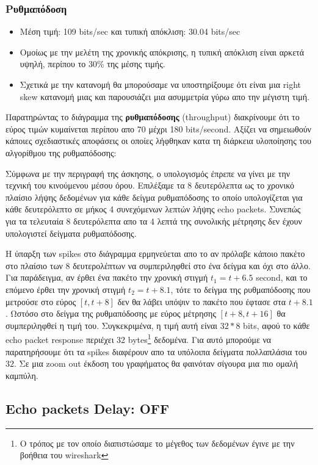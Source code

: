 \documentclass[hidelinks, 12pt, a4paper]{article}
\begin{document}
\subsubsection{Ρυθμαπόδοση}

\begin{itemize}
    \item Μέση τιμή: 109 bits/sec και τυπική απόκλιση: 30.04 bits/sec
    \item Ομοίως με την μελέτη της χρονικής απόκρισης, η τυπική απόκλιση είναι αρκετά υψηλή, περίπου το 30\% της μέσης τιμής.
    \item Σχετικά με την κατανομή θα μπορούσαμε να υποστηρίξουμε ότι είναι μια right skew κατανομή μιας και παρουσιάζει μια ασυμμετρία γύρω απο την μέγιστη τιμή.
\end{itemize}
Παρατηρώντας το διάγραμμα της \textbf{ρυθμαπόδοσης} (throughput) διακρίνουμε ότι το εύρος τιμών κυμαίνεται περίπου απο 70 μέχρι 180 bits/second. Αξίζει να σημειωθούν κάποιες σχεδιαστικές αποφάσεις οι οποίες λήφθηκαν κατα τη διάρκεια υλοποίησης του αλγορίθμου της ρυθμαπόδοσης:

Σύμφωνα με την περιγραφή της άσκησης, ο υπολογισμός έπρεπε να γίνει με την τεχνική του κινούμενου μέσου όρου. Επιλέξαμε τα 8 δευτερόλεπτα ως το χρονικό πλαίσιο λήψης δεδομένων για κάθε δείγμα ρυθμαπόδοσης το οποίο υπολογίζεται για κάθε δευτερόλεπτο σε μήκος 4 συνεχόμενων λεπτών λήψης echo packets. Συνεπώς για τα τελευταία 8 δευτερόλεπτα απο τα 4 λεπτά της συνολικής μέτρησης δεν έχουν υπολογιστεί δείγματα ρυθμαπόδοσης. 

Η ύπαρξη των spikes στο διάγραμμα ερμηνεύεται απο το αν πρόλαβε κάποιο πακέτο στο πλαίσιο των 8 δευτερολέπτων να συμπεριληφθεί στο ένα δείγμα και όχι στο άλλο. Για παράδειγμα, αν έρθει ένα πακέτο την χρονική στιγμή $t_1 = t + 6.5$ second, και το επόμενο έρθει την χρονική στιγμή $t_2 = t + 8.1$, τότε το δείγμα της ρυθμαπόδοσης που μετρούσε στο εύρος $[t, t+8]$ δεν θα λάβει υπόψιν το πακέτο που έφτασε στα $t + 8.1$. Ωστόσο στο δείγμα της ρυθμαπόδοσης με εύρος μέτρησης $[t+8, t+16]$ θα συμπεριληφθεί η τιμή του. Συγκεκριμένα, η τιμή αυτή είναι $32*8$ bits, αφού το κάθε echo packet response περιέχει 32 bytes\footnote{Ο τρόπος με τον οποίο διαπιστώσαμε το μέγεθος των δεδομένων έγινε με την βοήθεια του wireshark} δεδομένα. Για αυτό μπορούμε να παρατηρήσουμε ότι τα spikes διαφέρουν απο τα υπόλοιπα δείγματα πολλαπλάσια του $32$. Σε μια zoom out έκδοση του γραφήματος θα φαινόταν σίγουρα μια πιο ομαλή καμπύλη.


\subsection{Echo packets Delay: OFF}
\end{document}
